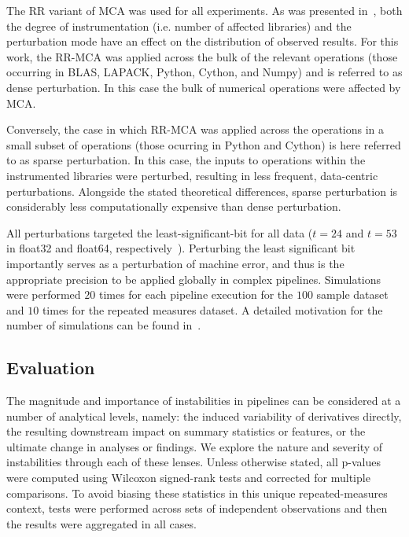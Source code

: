 \documentclass[fleqn,10pt]{SelfArx} %
\newcommand{\new}[1]{{#1}}
\newcommand{\newtwo}[1]{{\color{blue}#1\color{black}}}
\begin{document}
The RR variant of MCA was used for all experiments. As was presented in~\cite{Kiar2020-lb}, both the degree of
instrumentation (i.e. number of affected libraries) and the perturbation mode have an effect on the distribution of
observed results. For this work, the RR-MCA was applied across the bulk of the relevant operations (those occurring
in BLAS, LAPACK, Python, Cython, and Numpy) and is referred to as dense perturbation. In this case the bulk of
numerical operations were affected by MCA.

Conversely, the case in which RR-MCA was applied across the operations in a small subset of operations (those ocurring
in Python and Cython) is here referred to as sparse perturbation. In this case, the inputs to operations within the
instrumented libraries were perturbed, resulting in less frequent, data-centric perturbations. Alongside the stated theoretical
differences, sparse perturbation is considerably less computationally expensive than dense perturbation.

All perturbations targeted the least-significant-bit for all data ($t=24$ and $t=53$ in float32 and float64,
respectively~\cite{Denis2016-wo}). Perturbing the least significant bit importantly serves as a perturbation of
machine error, and thus is the appropriate precision to be applied globally in complex pipelines. Simulations were
performed $20$ times for each pipeline execution for the $100$ sample dataset and $10$ times for the repeated
measures dataset. A detailed motivation for the number of simulations can be found in~\cite{Sohier2018-ts}.

\subsection*{Evaluation}

The magnitude and importance of instabilities in pipelines can be considered at a number of analytical levels, namely:
the induced variability of derivatives directly, the resulting downstream impact on summary statistics or features, or
the ultimate change in analyses or findings. We explore the nature and severity of instabilities through each of these
lenses. Unless otherwise stated, all p-values were computed using Wilcoxon signed-rank tests \newtwo{and corrected for multiple comparisons}. \new{To avoid biasing
these statistics in this unique repeated-measures context, tests were performed across sets of independent
observations and then the results were aggregated in all cases.}
\end{document}
